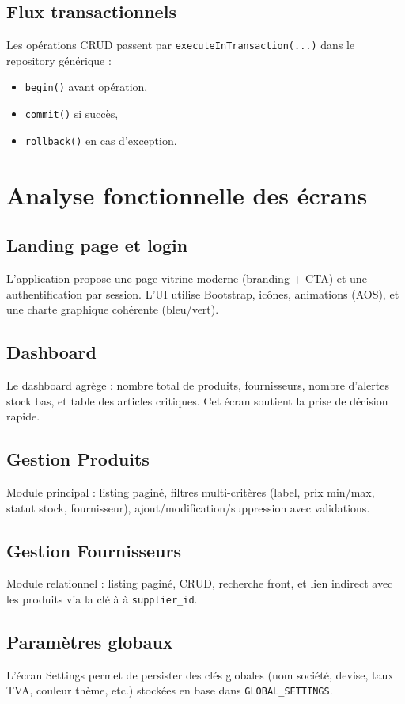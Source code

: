 \documentclass[12pt,a4paper]{report}
\begin{document}
\section{Flux transactionnels}
Les op\'erations CRUD passent par \texttt{executeInTransaction(...)} dans le repository g\'en\'erique :
\begin{itemize}[leftmargin=1.2cm]
    \item \texttt{begin()} avant op\'eration,
    \item \texttt{commit()} si succ\`es,
    \item \texttt{rollback()} en cas d'exception.
\end{itemize}

\chapter{Analyse fonctionnelle des \'ecrans}

\section{Landing page et login}
L'application propose une page vitrine moderne (branding + CTA) et une authentification par session. L'UI utilise Bootstrap, ic\^ones, animations (AOS), et une charte graphique coh\'erente (bleu/vert).

\section{Dashboard}
Le dashboard agr\`ege : nombre total de produits, fournisseurs, nombre d'alertes stock bas, et table des articles critiques. Cet \'ecran soutient la prise de d\'ecision rapide.

\section{Gestion Produits}
Module principal : listing pagin\'e, filtres multi-crit\`eres (label, prix min/max, statut stock, fournisseur), ajout/modification/suppression avec validations.

\section{Gestion Fournisseurs}
Module relationnel : listing pagin\'e, CRUD, recherche front, et lien indirect avec les produits via la cl\'e \`a \`a \texttt{supplier\_id}.

\section{Param\`etres globaux}
L'\'ecran Settings permet de persister des cl\'es globales (nom soci\'et\'e, devise, taux TVA, couleur th\`eme, etc.) stock\'ees en base dans \texttt{GLOBAL\_SETTINGS}.
\end{document}

